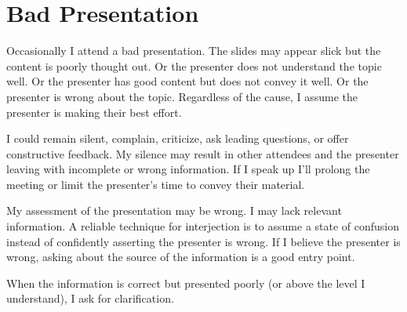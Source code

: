 \section{Bad Presentation}

Occasionally I attend a bad presentation. The slides may appear slick but the content is poorly thought out. Or the presenter does not understand the topic well. Or the presenter has good content but does not convey it well. Or the presenter is wrong about the topic. Regardless of the cause, I assume the presenter is making their best effort. 

I could remain silent, complain, criticize, ask leading questions, or offer constructive feedback. My silence may result in other attendees and the presenter leaving with incomplete or wrong information. If I speak up I'll prolong the meeting or limit the presenter's time to convey their material. 

My assessment of the presentation may be wrong. I may lack relevant information. A reliable technique for interjection is to assume a state of confusion instead of confidently asserting the presenter is wrong. 
If I believe the presenter is wrong, asking about the source of the information is a good entry point.

When the information is correct but presented poorly (or above the level I understand), I ask for clarification. 